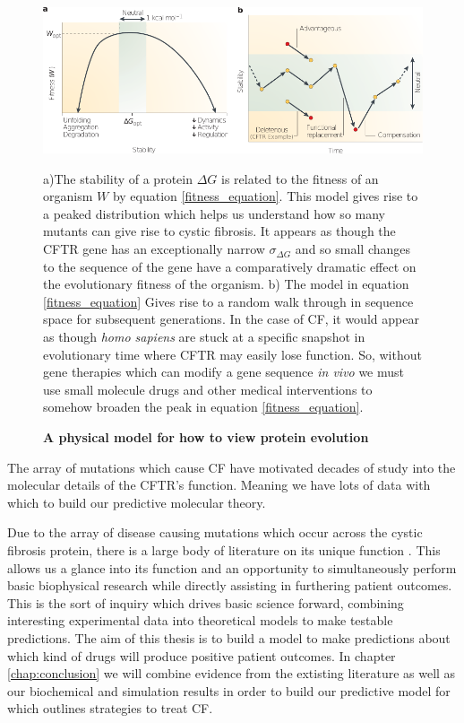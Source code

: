 \begin{figure}
	\begin{center}
		\includegraphics[width=1.0\textwidth]{figures/fitness_landscape_fig.pdf}
	\end{center}
	\captionsetup{singlelinecheck = false, justification=raggedright}
	\caption[A physical model for how to view protein evolution] {\textbf{A physical model for how to view protein evolution}}{a)The stability of a protein $\Delta G$ is related to the fitness of an organism $W$ by equation \ref{fitness_equation}. This model gives rise to a peaked distribution which helps us understand how so many mutants can give rise to cystic fibrosis. It appears as though the CFTR gene has an exceptionally narrow $\sigma_{\Delta G}$ and so small changes to the sequence of the gene have a comparatively dramatic effect on the evolutionary fitness of the organism. b) The model in equation \ref{fitness_equation} Gives rise to a random walk through in sequence space for subsequent generations. In the case of CF, it would appear as though \textit{homo sapiens} are stuck at a specific snapshot in evolutionary time where CFTR may easily lose function. So, without gene therapies which can modify a gene sequence \textit {in vivo} we must use small molecule drugs and other medical interventions to somehow broaden the peak in equation \ref{fitness_equation}.}
	\label{dna_structure}
\end{figure}

The array of mutations which cause CF have motivated decades of study into the molecular details of the CFTR's function\cite{csanady2019a}. Meaning we have lots of data with which to build our predictive molecular theory. 

Due to the array of disease causing mutations which occur across the cystic fibrosis protein, there is a large body of literature on its unique function \cite{csanady2019a}. This allows us a glance into its function and an opportunity to simultaneously perform basic biophysical research while directly assisting in furthering patient outcomes. This is the sort of inquiry which drives basic science forward, combining interesting experimental data into theoretical models to make testable predictions. The aim of this thesis is to build a model to make predictions about which kind of drugs will produce positive patient outcomes. In chapter \ref{chap:conclusion} we will combine evidence from the extisting literature as well as our biochemical and simulation results in order to build our predictive model for which outlines strategies to treat CF.

